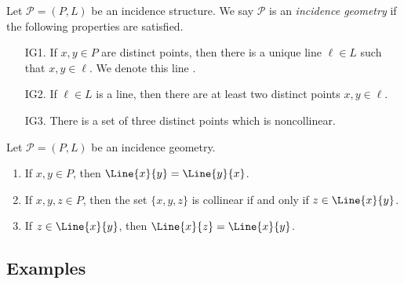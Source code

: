 \documentclass{article}
\begin{document}

\begin{dfn}
Let $\mathcal{P} = (P,L)$ be an incidence structure. We say $\mathcal{P}$ is an \emph{incidence geometry} if the following properties are satisfied.
\begin{itemize}
\item[IG1.] If $x,y \in P$ are distinct points, then there is a unique line $\ell \in L$ such that $x,y \in \ell$. We denote this line .
\item[IG2.] If $\ell \in L$ is a line, then there are at least two distinct points $x,y \in \ell$.
\item[IG3.] There is a set of three distinct points which is noncollinear.
\end{itemize}
\end{dfn}

\begin{prop}
Let $\mathcal{P} = (P,L)$ be an incidence geometry.
\begin{enumerate}
\item If $x,y \in P$, then $\Line{x}{y} = \Line{y}{x}$.
\item If $x,y,z \in P$, then the set $\{x,y,z\}$ is collinear if and only if $z \in \Line{x}{y}$.
\item If $z \in \Line{x}{y}$, then $\Line{x}{z} = \Line{x}{y}$.
\end{enumerate}
\end{prop}



\subsection*{Examples}
\end{document}
